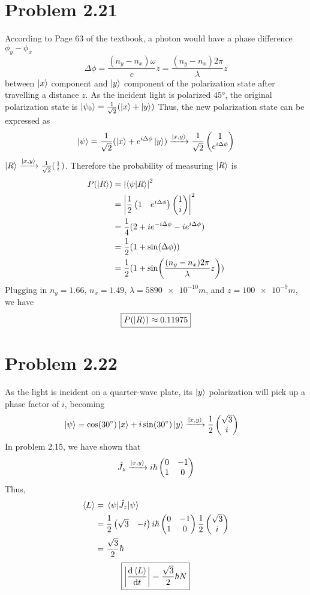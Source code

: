 \documentclass{article}
\begin{document}
\section*{Problem 2.21}
According to Page 63 of the textbook, a photon would have a phase difference $\phi_y - \phi_x$ 
\[ 
  \Delta \phi = \frac{(n_y-n_x)\omega}{c} z = \frac{(n_y-n_x)2\pi}{\lambda} z
\]
between $\ket{x}$ component and $\ket{y}$ component of the polarization state after travelling a distance $z$. As the incident light is polarized $\ang{45}$, the original polarization state is $\ket{\psi_0}=\frac{1}{\sqrt{2}}(\ket{x}+\ket{y})$ Thus, the new polarization state can be expressed as
\[
  \ket{\psi} = \frac{1}{\sqrt{2}} (\ket{x}+e^{i\Delta \phi}\ket{y}) \xrightarrow{\ket{x, y}}
  \frac{1}{\sqrt{2}} \pmqty{1 \\ e^{i \Delta \phi}}
\]
$\ket{R} \xrightarrow{\ket{x, y}} \frac{1}{\sqrt{2}} \spmqty{1 \\ i}$.
Therefore the probability of measuring $\ket{R}$ is 
\[ 
  \begin{split}
  P(\ket{R}) &= \abs{\braket{\psi}{R}}^2 \\
  &= \abs{\frac{1}{2}\pmqty{1 & e^{i \Delta \phi}} \pmqty{1 \\ i}}^2 \\
  &= \frac{1}{4} (2+ie^{-i\Delta \phi}-ie^{i \Delta \phi}) \\
  &= \frac{1}{2} (1+\sin(\Delta \phi)) \\
  &= \frac{1}{2} (1+\sin(\frac{(n_y-n_x)2\pi}{\lambda} z))
  \end{split}
\] 
Plugging in $n_y = 1.66$, $n_x = 1.49$, $\lambda = \num{5890e-10}\si{m}$, and $z=\num{100e-9}\si{m}$, we have
\[ 
  \boxed{
    P(\ket{R}) \approx 0.11975
  }
\]

\section*{Problem 2.22}
As the light is incident on a quarter-wave plate, its $\ket{y}$ polarization will pick up a phase factor of $i$, becoming
\[ 
  \begin{split}
    \ket{\psi} &= \cos(\ang{30}) \ket{x} + i \sin(\ang{30}) \ket{y}
    \xrightarrow{\ket{x, y}} \frac{1}{2} \pmqty{\sqrt{3} \\ i}
  \end{split}
\]
In problem 2.15, we have shown that
\[ 
  \hat{J_z} \xrightarrow{\ket{x, y}} i\hbar \pmqty{\admat[0]{-1, 1}}
\]
Thus, 
\[ 
  \begin{split}
    \expval{L} &= \ev{\hat{J_z}}{\psi} \\
    &= \frac{1}{2} \pmqty{\sqrt{3} & -i} i\hbar \pmqty{\admat[0]{-1, 1}} \frac{1}{2} \pmqty{\sqrt{3} \\ i} \\
    &= \frac{\sqrt{3}}{2} \hbar
  \end{split}
\]
\[
  \boxed{
    \abs{\dv{\expval{L}}{t}} = \frac{\sqrt{3}}{2} \hbar N
  }
\]
\end{document}
